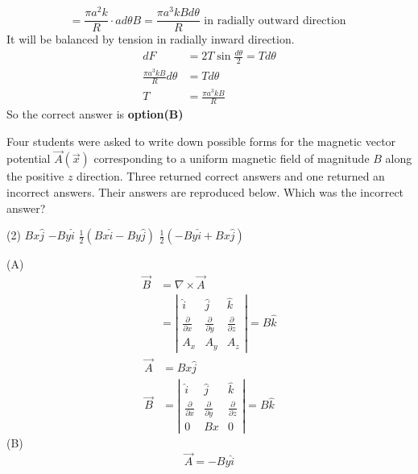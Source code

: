 \begin{questions}
\begin{answer}
	$$
	=\frac{\pi a^{2} k}{R} \cdot a d \theta B=\frac{\pi a^{3} k B d \theta}{R} \text { in radially outward direction }
	$$
	It will be balanced by tension in radially inward direction.
	$$	\begin{aligned}
	d F &=2 T \sin \frac{d \theta}{2}=T d \theta \\
	\frac{\pi a^{3} k B}{R} d \theta &=T d \theta \\
	T &=\frac{\pi a^{3} k B}{R}
	\end{aligned}
	$$
	So the correct answer is \textbf{option(B)}
\end{answer}
\begin{minipage}{\textwidth}
	\question Four students were asked to write down possible forms for the magnetic vector potential $\vec{A}(\vec{x})$ corresponding to a uniform magnetic field of magnitude $B$ along the positive $z$ direction. Three returned correct answers and one returned an incorrect answers. Their answers are reproduced below. Which was the incorrect answer?
\end{minipage}
\begin{tasks}(2)
	\task[\textbf{A.}] $B x \hat{j}$
	\task[\textbf{B.}]   $-B y \hat{i}$
	\task[\textbf{C.}]   $\frac{1}{2}(B x \hat{i}-B y \hat{j})$
	\task[\textbf{D.}] $\frac{1}{2}(-B y \hat{i}+B x \hat{j})$
\end{tasks}
\begin{answer}
	(A)
$$
\begin{aligned}
\vec{B} &=\nabla \times \vec{A} \\
&=\left|\begin{array}{ccc}
\hat{i} & \hat{j} & \hat{k} \\
\frac{\partial}{\partial x} & \frac{\partial}{\partial y} & \frac{\partial}{\partial z} \\
A_{x} & A_{y} & A_{z}
\end{array}\right|=B \hat{k}
\end{aligned}
$$
$$
\begin{aligned}
\vec{A} &=B x \hat{j} \\
\vec{B} &=\left|\begin{array}{rrr}
\hat{i} & \hat{j} & \hat{k} \\
\frac{\partial}{\partial x} & \frac{\partial}{\partial y} & \frac{\partial}{\partial z} \\
0 & B x & 0
\end{array}\right|=B \hat{k}
\end{aligned}
$$
(B)
$$
\vec{A}=-B y \hat{i}
$$\\

\end{answer}
\end{questions}
